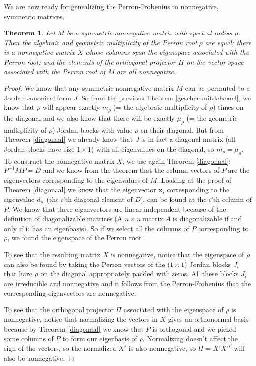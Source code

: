 \documentclass[a4paper,11pt]{report}
\newtheorem{theorem}{Theorem}[section]
\begin{document}
We are now ready for genealizing the Perron-Frobenius to nonnegative, symmetric 
matrices.
\begin{theorem}\label{ultiemvoorspel}
  Let $M$ be a symmetric nonnegative matrix with spectral radius $\rho$. Then 
  the algebraic and geometric multiplicity of the Perron root $\rho$ are equal; 
  there is a nonnegative matrix $X$ whose columns span the eigenspace  associated with the Perron root; and the elements of the orthogonal projector 
  $\Pi$ on the vector space associated with the Perron root of $M$ are all 
  nonnegative.
\end{theorem}
\begin{proof}
  We know that any symmetric nonnegative matrix $M$ can be permuted to a Jordan canonical form 
  $J$. So from the previous Theorem \ref{geschenkuitdehemel},
  we know that $\rho$ will appear exactly $m_\rho$ (= the algebraic multiplicity of $\rho$) times on the diagonal 
  and we also know that there will be exactly $\mu_\rho$ (= the geometric multiplicity of $\rho$) Jordan blocks with value $\rho$ on their diagonal. But from
  Theorem \ref{diagonaal} we already know that $J$ is in fact a diagonal matrix (all Jordan blocks have size $1\times 1$) with all
  eigenvalues on the diagonal, so
  $m_\rho = \mu_\rho$.  To construct the nonnegative matrix $X$, we use again Theorem \ref{diagonaal}:
  $P^{-1}MP = D$ and we know from the theorem that the column vectors of $P$ are the eigenvectors 
  corresponding to the eigenvalues of $M$. Looking at the proof of Theorem \ref{diagonaal} we know 
  that the eigenvector $\mathbf{x}_i$ corresponding to the eigenvalue $d_{ii}$ (the $i$'th diagonal element of $D$), 
  can be found at the $i$'th column of $P$. We know that these eigenvectors are linear 
  independent because of the definition of diagonalizable matrices (A $n \times n$ matrix $A$ is diagonalizable if and only if it has an eigenbasis). 
  So if we select all the columns of $P$ corresponding to 
  $\rho$, we found the eigenspace of the Perron root. 
  
  To see that the resulting 
  matrix $X$ is nonnegative, notice that the eigenspace of $\rho$ can also be 
  found by taking the Perron vectors of the ($1 \times 1$) Jordan blocks $J_i$ that have $\rho$ on the diagonal appropriately padded 
  with zeros. All these blocks $J_i$ are irreducible and nonnegative and it 
  follows from the Perron-Frobenius that the corresponding eigenvectors are
  nonnegative. 
  
  To see that the orthogonal projector $\Pi$ associated with the eigenspace of $\rho$ 
  is nonnegative, notice that normalizing the vectors in $X$ gives an 
  orthonormal basis because by Theorem \ref{diagonaal} we know that $P$ is orthogonal and we 
  picked some columns of $P$ to form our eigenbasis of $\rho$. Normalizing doesn't affect the sign of the vectors, so the 
  normalized $X'$ is also nonnegative, so $\Pi = X'X'^T$ will also be nonnegative.
  \end{proof}
  
\end{document}
